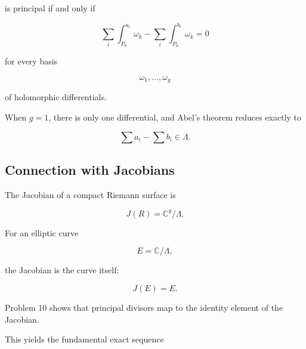 \documentclass[12pt,a4paper]{article}
\theoremstyle{notespace}
\begin{document}
is principal if and only if

\[
\sum_i
\int_{P_0}^{a_i}
\omega_k
-
\sum_i
\int_{P_0}^{b_i}
\omega_k
=
0
\]

for every basis

\[
\omega_1,\dots,\omega_g
\]

of holomorphic differentials.

When \(g=1\), there is only one differential, and Abel's theorem reduces exactly to

\[
\sum a_i-\sum b_i\in\Lambda.
\]

\begin{center}
\end{center}

\subsection{Connection with Jacobians}

The Jacobian of a compact Riemann surface is

\[
J(R)
=
\mathbb C^g/\Lambda.
\]

For an elliptic curve

\[
E=\mathbb C/\Lambda,
\]

the Jacobian is the curve itself:

\[
J(E)=E.
\]

Problem 10 shows that principal divisors map to the identity element of the Jacobian.

This yields the fundamental exact sequence
\end{document}
